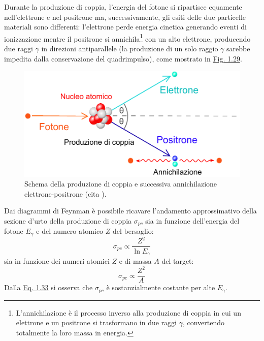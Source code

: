 \documentclass[12pt,a4paper,twoside]{report}
\begin{document}
	Durante la produzione di coppia, l'energia del fotone si ripartisce equamente nell'elettrone e nel positrone ma, successivamente, gli esiti delle due particelle materiali sono differenti: l'elettrone perde energia cinetica generando eventi di ionizzazione mentre il positrone si annichila\footnote{L'annichilazione è il processo inverso alla produzione di coppia in cui un elettrone e un positrone si trasformano in due raggi $\gamma$, convertendo totalmente la loro massa in energia.} con un alto elettrone, producendo due raggi $\gamma$ in direzioni antiparallele (la produzione di un solo raggio $\gamma$ sarebbe impedita dalla conservazione del quadrimpulso), come mostrato in \hyperref[fig:pair_production]{Fig. 1.29}.
	\begin{figure}[H]
		\centering
		\includegraphics[width=0.9\linewidth]{pair_production.pdf}
		\caption{Schema della produzione di coppia e successiva annichilazione elettrone-positrone (cita
			).}
		\label{fig:pair_production}
	\end{figure}
	Dai diagrammi di Feynman è possibile ricavare l'andamento approssimativo della sezione d'urto della produzione di coppia $\sigma_{pc}$ sia in funzione dell'energia del fotone $E_\gamma$ e del numero atomico $Z$ del bersaglio:
	\begin{equation}
		\sigma_{pc}\propto \frac{Z^2}{\ln{E_\gamma}}
		\label{eq:sigma_pc1}
	\end{equation}
	sia in funzione dei numeri atomici $Z$ e di massa $A$ del target:
	\begin{equation}
		\sigma_{pc}\propto \frac{Z^2}{A}
		\label{eq:sigma_pc2}
	\end{equation}
	Dalla \hyperref[eq:sigma_pc1]{Eq. 1.33} si osserva che $\sigma_{pc}$ è sostanzialmente costante per alte $E_\gamma$.	
	
\end{document}
